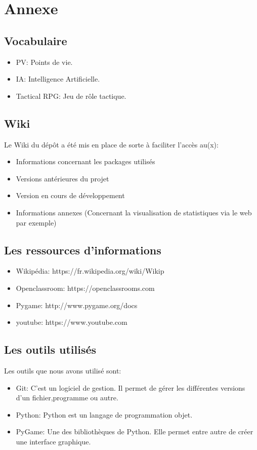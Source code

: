 \documentclass{article}
\begin{document}
\newpage
\section{Annexe}
 \subsection{Vocabulaire}
 \begin{itemize}
  \item PV: Points de vie.
  \item IA: Intelligence Artificielle.
  \item Tactical RPG: Jeu de rôle tactique.
 \end{itemize}
 
 \subsection{Wiki}
 	Le Wiki du dépôt a été mis en place de sorte à faciliter l'accès au(x):
 	\begin{itemize}
 	\item Informations concernant les packages utilisés
 	\item Versions antérieures du projet
 	\item Version en cours de développement
 	\item Informations annexes (Concernant la visualisation de statistiques via le web par exemple)
 	\end{itemize}
 
 \subsection{Les ressources d'informations}
 
 \begin{itemize}
 \item Wikipédia: https://fr.wikipedia.org/wiki/Wikip
 \item Openclassroom: https://openclassrooms.com
 \item Pygame: http://www.pygame.org/docs
 \item youtube: https://www.youtube.com
 \end{itemize} 
 
 \subsection{Les outils utilisés}
  Les outils que nous avons utilisé sont:
  \begin{itemize}
   \item Git: C'est un logiciel de gestion. Il permet de gérer les différentes versions d'un fichier,programme ou autre.
   \item Python: Python est un langage de programmation objet.
   \item PyGame: Une des bibliothèques de Python. Elle permet entre autre de créer une interface graphique.
  \end{itemize}
\end{document}
